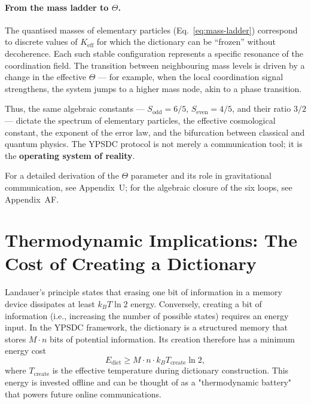 \documentclass[12pt,a4paper]{article}
\theoremstyle{remark}
\begin{document}
	\paragraph{From the mass ladder to \(\Theta\).}
	The quantised masses of elementary particles (Eq.~\ref{eq:mass-ladder}) correspond to discrete values of \(K_{\mathrm{eff}}\) for which the dictionary can be ``frozen'' without decoherence. Each such stable configuration represents a specific resonance of the coordination field. The transition between neighbouring mass levels is driven by a change in the effective \(\Theta\) --- for example, when the local coordination signal strengthens, the system jumps to a higher mass node, akin to a phase transition.
	
	Thus, the same algebraic constants --- \(S_{\mathrm{odd}} = 6/5\), \(S_{\mathrm{even}} = 4/5\), and their ratio \(3/2\) --- dictate the spectrum of elementary particles, the effective cosmological constant, the exponent of the error law, and the bifurcation between classical and quantum physics. The YPSDC protocol is not merely a communication tool; it is the \textbf{operating system of reality}.
	
	For a detailed derivation of the \(\Theta\) parameter and its role in gravitational communication, see Appendix~U; for the algebraic closure of the six loops, see Appendix~AF.
	
	\section{Thermodynamic Implications: The Cost of Creating a Dictionary}
	\label{sec:thermo}
	
	Landauer's principle \cite{Landauer1961} states that erasing one bit of information in a memory device dissipates at least $k_B T \ln 2$ energy. Conversely, creating a bit of information (i.e., increasing the number of possible states) requires an energy input. In the YPSDC framework, the dictionary is a structured memory that stores $M \cdot n$ bits of potential information. Its creation therefore has a minimum energy cost
	\begin{equation}
		E_{\text{dict}} \ge M \cdot n \cdot k_B T_{\text{create}} \ln 2, \label{eq:thermo-cost}
	\end{equation}
	where $T_{\text{create}}$ is the effective temperature during dictionary construction. This energy is invested offline and can be thought of as a "thermodynamic battery" that powers future online communications.
	
\end{document}
